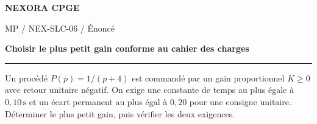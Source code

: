 \documentclass[11pt,a4paper]{article}
\begin{document}
{\small\bfseries\color{nexorablue} NEXORA CPGE}\par
{\small MP / NEX-SLC-06 / Énoncé}\par
{\LARGE\bfseries Choisir le plus petit gain conforme au cahier des charges}\par
\vspace{0.25em}\hrule\vspace{0.6em}

Un procédé $P(p)=1/(p+4)$ est commandé par un gain proportionnel $K\ge0$ avec retour unitaire négatif. On exige une constante de temps au plus égale à $0{,}10\,\mathrm s$ et un écart permanent au plus égal à $0{,}20$ pour une consigne unitaire. Déterminer le plus petit gain, puis vérifier les deux exigences.
\end{document}
